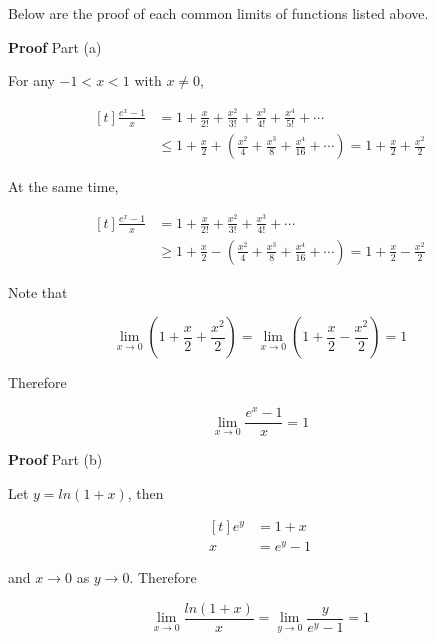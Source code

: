 \documentclass[a4paper,12pt]{article}
\newcommand{\s}{\vspace{1mm}}
\newcommand{\n}{\vspace{3mm}}
\newenvironment{block}[4][Block]{ %
\begin{list}{}{
  \setlength{\leftmargin}{0mm}
  \setlength{\rightmargin}{0mm}
  \setlength{\topsep}{0mm}
  \setlength{\partopsep}{0mm}
  \parsep\parskip
  \setlength{\itemsep}{-\parsep}
  }
  \needspace{\baselineskip}
  \item \textbf{#2 #3} \hspace{1mm} #4
  \vspace{1mm}
  \item
  }
{
\end{list}
}
\begin{document}
Below are the proof of each common limits of functions listed above.\n

\begin{block}{Proof}{}{Part (a)}
  For any $-1<x<1$ with $x\neq 0$,

  $$\begin{aligned}[t]
    \frac{e^{x}-1}{x}&=1+\frac{x}{2!}+\frac{x^{2}}{3!}+\frac{x^{3}}{4!}+\frac{x^{4}}{5!}+\cdots\\
    &\leq 1+\frac{x}{2}+(\frac{x^{2}}{4}+\frac{x^{3}}{8}+\frac{x^{4}}{16}+\cdots)=1+\frac{x}{2}+\frac{x^{2}}{2}
  \end{aligned}$$\s

  At the same time,

  $$\begin{aligned}[t]
    \frac{e^{x}-1}{x}&=1+\frac{x}{2!}+\frac{x^{2}}{3!}+\frac{x^{3}}{4!}+\cdots\\
    &\geq 1+\frac{x}{2}-(\frac{x^{2}}{4}+\frac{x^{3}}{8}+\frac{x^{4}}{16}+\cdots)=1+\frac{x}{2}-\frac{x^{2}}{2}
  \end{aligned}$$\s

  Note that

  $$\lim_{x\to 0}(1+\frac{x}{2}+\frac{x^{2}}{2})=\lim_{x\to 0}(1+\frac{x}{2}-\frac{x^{2}}{2})=1$$\s

  Therefore

  $$\lim_{x\to 0}\frac{e^{x}-1}{x}=1$$

\end{block}\n

\begin{block}{Proof}{}{Part (b)}
  Let $y=ln(1+x)$, then

  $$\begin{aligned}[t]
    e^{y}&=1+x\\
    x&=e^{y}-1
  \end{aligned}$$\s

  and $x\to 0$ as $y\to 0$. Therefore

  $$\lim_{x\to 0}\frac{ln(1+x)}{x}=\lim_{y\to 0}\frac{y}{e^{y}-1}=1$$

\end{block}\n
\end{document}
